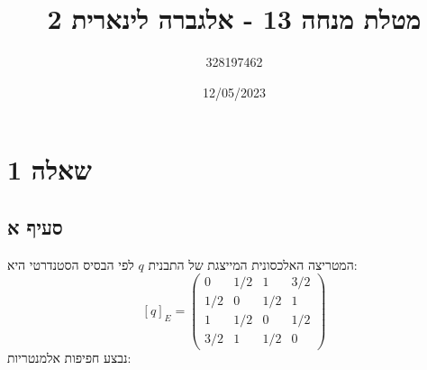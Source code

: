 \documentclass{article}
\title{מטלת מנחה 13 - אלגברה לינארית 2}
\author{328197462}
\date{12/05/2023}
\begin{document}
\maketitle

\section*{שאלה 1}
\subsection*{סעיף א}

המטריצה האלכסונית המייצגת של התבנית $q$ לפי הבסיס הסטנדרטי היא:
\[
    [q]_E = \begin{pmatrix}
        0   & 1/2 & 1   & 3/2 \\
        1/2 & 0   & 1/2 & 1   \\
        1   & 1/2 & 0   & 1/2 \\
        3/2 & 1   & 1/2 & 0
    \end{pmatrix}
\]
נבצע חפיפות אלמנטריות:
\end{document}
